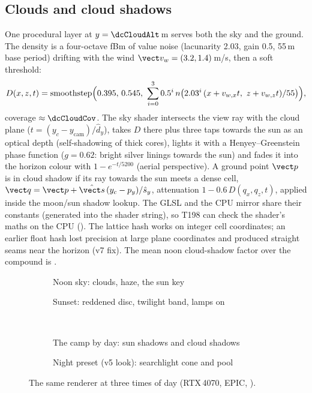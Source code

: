 \subsection{Clouds and cloud shadows}
One procedural layer at $y=\dcCloudAlt$\,m serves both the sky and the ground. The density is a four-octave fBm of value noise (lacunarity 2.03, gain 0.5, 55\,m base period) drifting with the wind $\vect v_w=(3.2,1.4)$\,m/s, then a soft threshold:
\begin{equation}
D(x,z,t)=\mathrm{smoothstep}\Bigl(0.395,\,0.545,\ \sum_{i=0}^{3}0.5^i\,n\bigl(2.03^i\,(x+v_{w,x}t,\ z+v_{w,z}t)/55\bigr)\Bigr),
\end{equation}
coverage $\approx\dcCloudCov$. The sky shader intersects the view ray with the cloud plane ($t=(y_c-y_\text{cam})/\hat d_y$), takes $D$ there plus three taps towards the sun as an optical depth (self-shadowing of thick cores), lights it with a Henyey--Greenstein phase function ($g=0.62$: bright silver linings towards the sun) and fades it into the horizon colour with $1-e^{-t/5200}$ (aerial perspective). A ground point $\vect p$ is in cloud shadow if its ray towards the sun meets a dense cell, $\vect q=\vect p+\hat{\vect s}\,(y_c-p_y)/\hat s_y$, attenuation $1-0.6\,D(q_x,q_z,t)$, applied inside the moon/sun shadow lookup. The GLSL and the CPU mirror share their constants (generated into the shader string), so T198 can check the shader's maths on the CPU (). The lattice hash works on integer cell coordinates; an earlier float hash lost precision at large plane coordinates and produced straight seams near the horizon (v7 fix). The mean noon cloud-shadow factor over the compound is \dcNoonCloud.
\begin{figure}[h]
\centering
\begin{subfigure}{0.495\linewidth}\caption{Noon sky: clouds, haze, the sun key}\end{subfigure}
\begin{subfigure}{0.495\linewidth}\caption{Sunset: reddened disc, twilight band, lamps on}\end{subfigure}\\[1mm]
\begin{subfigure}{0.495\linewidth}\caption{The camp by day: sun shadows and cloud shadows}\end{subfigure}
\begin{subfigure}{0.495\linewidth}\caption{Night preset (v5 look): searchlight cone and pool}\end{subfigure}
\caption{The same renderer at three times of day (RTX\,4070, EPIC, ).}\label{fig:sky}
\end{figure}

